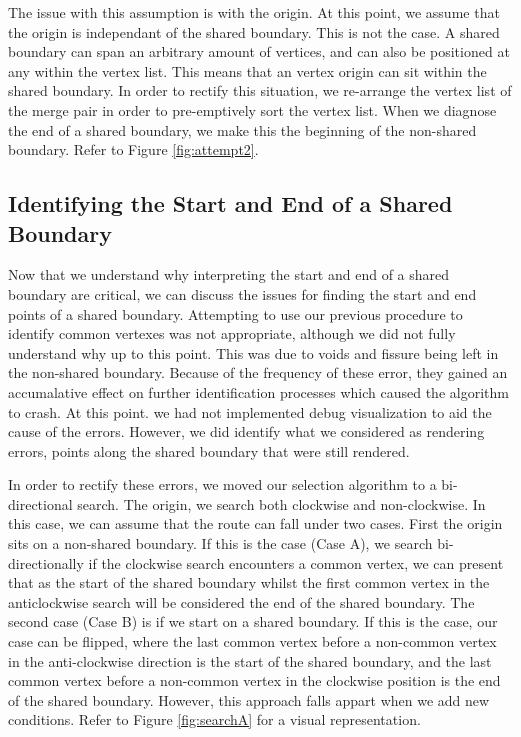 The issue with this assumption is with the origin. At this point, we assume that the origin is independant of the shared boundary. This is not the case. A shared boundary can span an arbitrary amount of vertices, and can also be positioned at any within the vertex list. This means that an vertex origin can sit within the shared boundary. In order to rectify this situation, we re-arrange the vertex list of the merge pair in order to pre-emptively sort the vertex list. When we diagnose the end of a shared boundary, we make this the beginning of the non-shared boundary. Refer to Figure \ref{fig:attempt2}.


\subsection{Identifying the Start and End of a Shared Boundary}
Now that we understand why interpreting the start and end of a shared boundary are critical, we can discuss the issues for finding the start and end points of a shared boundary. Attempting to use our previous procedure to identify common vertexes was not appropriate, although we did not fully understand why up to this point. This was due to voids and fissure being left in the non-shared boundary. Because of the frequency of these error, they gained an accumalative effect on further identification processes which caused the algorithm to crash. At this point. we had not implemented debug visualization to aid the cause of the errors. However, we did identify what we considered as rendering errors, points along the shared boundary that were still rendered.

In order to rectify these errors, we moved our selection algorithm to a bi-directional search. The origin, we search both clockwise and non-clockwise. In this case, we can assume that the route can fall under two cases. First the origin sits on a non-shared boundary. If this is the case (Case A), we search bi-directionally if the clockwise search encounters a common vertex, we can present that as the start of the shared boundary whilst the first common vertex in the anticlockwise search will be considered the end of the shared boundary. The second case (Case B) is if we start on a shared boundary. If this is the case, our case can be flipped, where the last common vertex before a non-common vertex in the anti-clockwise direction is the start of the shared boundary, and the last common vertex before a non-common vertex in the clockwise position is the end of the shared boundary. However, this approach falls appart when we add new conditions. Refer to Figure \ref{fig:searchA} for a visual representation.

